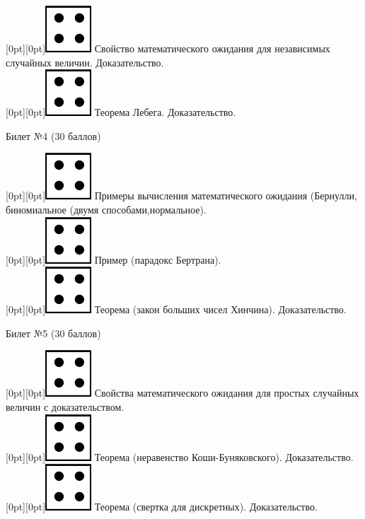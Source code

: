 \documentclass[preview]{standalone}
\begin{document}
\raisebox{-1pt}[0pt][0pt]{\includegraphics[width=0.02\linewidth]{4.png}} Свойство  математического ожидания для независимых случайных величин. Доказательство. \\
\raisebox{-1pt}[0pt][0pt]{\includegraphics[width=0.02\linewidth]{4.png}} Теорема Лебега. Доказательство. \\
\begin{center} {\Large Билет №4 (30 баллов)} \end{center}
\raisebox{-1pt}[0pt][0pt]{\includegraphics[width=0.02\linewidth]{4.png}} Примеры вычисления математического ожидания (Бернулли, биномиальное (двумя способами,нормальное). \\
\raisebox{-1pt}[0pt][0pt]{\includegraphics[width=0.02\linewidth]{4.png}} Пример (парадокс Бертрана). \\ 
\raisebox{-1pt}[0pt][0pt]{\includegraphics[width=0.02\linewidth]{4.png}}  Теорема (закон больших чисел Хинчина).  Доказательство. \\
\begin{center} {\Large Билет №5 (30 баллов)} \end{center}
\raisebox{-1pt}[0pt][0pt]{\includegraphics[width=0.02\linewidth]{4.png}} Свойства математического ожидания для  простых случайных величин с доказательством. \\
\raisebox{-1pt}[0pt][0pt]{\includegraphics[width=0.02\linewidth]{4.png}} Теорема (неравенство Коши-Буняковского). Доказательство. \\
\raisebox{-1pt}[0pt][0pt]{\includegraphics[width=0.02\linewidth]{4.png}} Теорема (свертка для дискретных). Доказательство. \\
\end{document}
